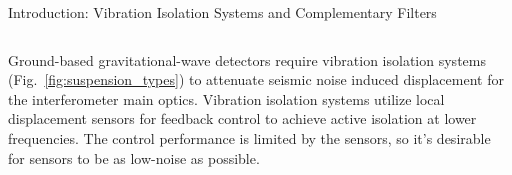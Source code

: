 \documentclass{beamer}
\begin{document}
\begin{frame}[t]
	\begin{columns}[t]
		
		\begin{column}{0.32\linewidth}
			
			\begin{block}{Introduction: Vibration Isolation Systems and Complementary Filters}
				\medskip
				
				\begin{columns}[t, onlytextwidth]
					\begin{column}{0.47\textwidth}	
					Ground-based gravitational-wave detectors require vibration isolation systems (Fig.~\ref{fig:suspension_types}) to attenuate seismic noise induced displacement for the interferometer main optics.
					Vibration isolation systems utilize local displacement sensors for feedback control to achieve active isolation at lower frequencies.
					The control performance is limited by the sensors, so it's desirable for sensors to be as low-noise as possible.
					
					\medskip
					

\end{column}
\end{columns}
\end{block}
\end{column}
\end{columns}
\end{frame}
\end{document}
